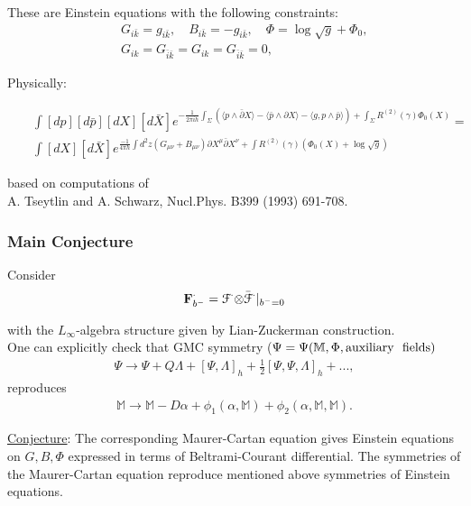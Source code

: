 \documentclass[9pt]{beamer}
\def\b{\bar}
\def\b{\bar}
\begin{document}
\begin{frame}
These are Einstein equations with the following constraints:
\begin{eqnarray*}\label{constr}
&&G_{i\bar{k}}=g_{i\bar{k}}, \quad B_{i\bar{k}}=-g_{i\bar{k}}, \quad \Phi=\log\sqrt{g}+\Phi_0,\\
&&G_{ik}=G_{\b i \b k}=G_{ik}=G_{\b i \b k}=0,\nonumber
\end{eqnarray*}

Physically:

\begin{eqnarray*}
&&\int [dp][d\b p][dX][d\b X]e^{-\frac{1}{2\pi i h}\int_\Sigma (\langle p\wedge\bar{\partial} X\rangle-
\langle \bar{p}\wedge{\partial} X\rangle
-\langle g, p\wedge \bar{p} \rangle)+\int_{\Sigma} R^{(2)}(\gamma)\Phi_0(X)}=\\
&&\int [dX][d\b X]e^{\frac{-1}{4\pi h}\int d^2 z
(G_{\mu\nu}+B_{\mu\nu})\partial X^{\mu}\bar{\partial}X^{\nu}+\int R^{(2)}(\gamma)(\Phi_0(X)+\log\sqrt{g})}
\end{eqnarray*}

based on computations of \\
A. Tseytlin and A. Schwarz, Nucl.Phys. B399 (1993) 691-708. 

\end{frame}

\begin{frame}
\frametitle{Main Conjecture}
Consider
\begin{eqnarray*}
{\bf F}^{\cdot}_{b^-}=\mathcal{F}^{\cdot}{\otimes}\bar {\mathcal{F}}^{\cdot}\vert_{b^-=0} 
\end{eqnarray*}

with the $L_{\infty}$-algebra structure given by Lian-Zuckerman construction. \\

One can explicitly check that GMC symmetry ($\Psi=\Psi(\mathbb{M}, \Phi, \rm{auxiliary~\ fields})$
\begin{eqnarray*}
\Psi\to \Psi+Q\Lambda+[\Psi,\Lambda]_h+\frac{1}{2}[\Psi,\Psi,\Lambda]_h+...,
\end{eqnarray*} 
reproduces
\begin{eqnarray*}
{\mathbb{M}}\to {\mathbb{M}}-D\alpha+ \phi_1(\alpha,{\mathbb{M}})+\phi_2(\alpha,{\mathbb{M}},{\mathbb{M}}).
\end{eqnarray*}

\vspace{5mm}

\underline{Conjecture}: The corresponding Maurer-Cartan equation gives Einstein equations on $G,B, \Phi$ expressed in terms of Beltrami-Courant differential. The symmetries of the Maurer-Cartan equation reproduce mentioned above symmetries of Einstein equations.
\end{frame}




\begin{frame}[t]
\vspace{35mm}
\begin{center}
\Huge{}
\end{center}
\end{frame}
\end{document}
